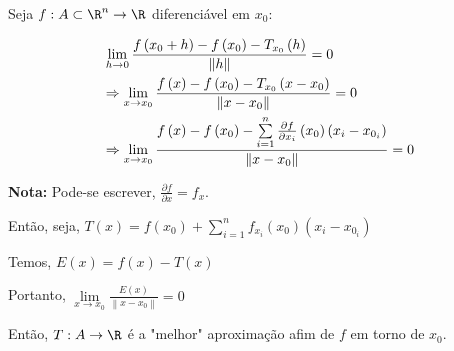 \documentclass[11pt, oneside, a4paper]{gsm-l}
\begin{document}
\begin{defi}
Seja $f:A \subset \R^n \to \R$ diferenciável em $x_0$:

\[
\begin{gathered}
  \mathop {\lim }\limits_{h \to 0} \frac{{f\left( {x_0  + h} \right) - f\left( {x_0 } \right) - T_{x_0 } \left( h \right)}}
{{\left\| h \right\|}} = 0 \hfill \\
   \Rightarrow \mathop {\lim }\limits_{x \to x_0 } \frac{{f\left( x \right) - f\left( {x_0 } \right) - T_{x_0 } \left( {x - x_0 } \right)}}
{{\left\| {x - x_0 } \right\|}} = 0 \hfill \\
   \Rightarrow \mathop {\lim }\limits_{x \to x_0 } \frac{{f\left( x \right) - f\left( {x_0 } \right) - \sum\limits_{i = 1}^n {\frac{{\partial f}}
{{\partial x_i }}\left( {x_0 } \right)\left( {x_i  - x_{0_i } } \right)} }}
{{\left\| {x - x_0 } \right\|}} = 0 \hfill \\
\end{gathered}
\]

\textbf{Nota:} Pode-se escrever, $\frac{{\partial f}}{{\partial x}} = f_x$.

    Então, seja, $T\left( x \right) = f\left( {x_0 } \right) + \sum\limits_{i = 1}^n {f_{x_i } \left( {x_0 } \right)\left( {x_i  - x_{0_i } } \right)}$

Temos,  $E\left( x \right) = f\left( x \right) - T\left( x \right)$

    Portanto, $\displaystyle \mathop {\lim }\limits_{x \to x_0 } \frac{{E\left( x \right)}}{{\left\| {x - x_0 } \right\|}} = 0$

    Então, $T:A \to \R$ é a "melhor" aproximação afim de $f$ em torno de $x_0$.
\end{defi}
\end{document}
